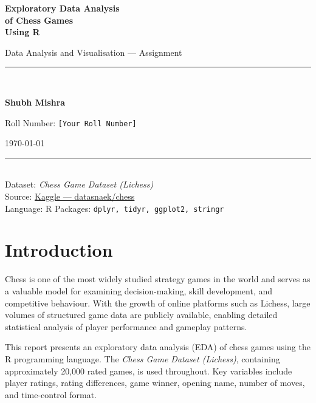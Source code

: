 \documentclass[12pt,a4paper]{article}
\begin{document}
\begin{titlepage}
    \centering
    \vspace*{2cm}
    {\Huge\bfseries Exploratory Data Analysis\\[0.4em]
     of Chess Games\\[0.4em]
     Using R\par}
    \vspace{1.5cm}
    {\large Data Analysis and Visualisation --- Assignment\par}
    \vspace{2cm}
    \rule{0.6\linewidth}{0.4pt}\\[0.8em]
    {\Large\bfseries Shubh Mishra\par}
    \vspace{0.5cm}
    {\large Roll Number: \texttt{[Your Roll Number]}\par}
    \vspace{0.5cm}
    {\large \today\par}
    \vspace{2cm}
    \rule{0.6\linewidth}{0.4pt}\\[0.8em]
    {\normalsize
        Dataset: \textit{Chess Game Dataset (Lichess)}\\[0.3em]
        Source: \href{https://www.kaggle.com/datasets/datasnaek/chess}{Kaggle --- datasnaek/chess}\\[0.3em]
        Language: R \textbar{} Packages: \texttt{dplyr, tidyr, ggplot2, stringr}
    }
    \vfill
\end{titlepage}

\tableofcontents
\newpage

\section{Introduction}

Chess is one of the most widely studied strategy games in the world and serves as a valuable model for examining decision-making, skill development, and competitive behaviour. With the growth of online platforms such as Lichess, large volumes of structured game data are publicly available, enabling detailed statistical analysis of player performance and gameplay patterns.

This report presents an exploratory data analysis (EDA) of chess games using the R programming language. The \textit{Chess Game Dataset (Lichess)}, containing approximately 20,000 rated games, is used throughout. Key variables include player ratings, rating differences, game winner, opening name, number of moves, and time-control format.
\end{document}
